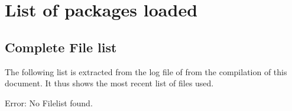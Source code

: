 
\chapter{List of packages loaded}

\section{Complete File list}
\label{sec:appendix:filelist}
The following list is extracted from the log file of  from the compilation of this document. It thus shows the most recent list of files used.

%
	{}
	{Error: No Filelist found.}

